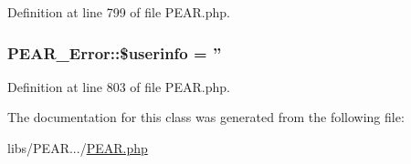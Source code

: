 Definition at line 799 of file P\-E\-A\-R.\-php.

\hypertarget{classPEAR__Error_ad201e08b4f3faace7a729ccf2744fdee}{
\subsubsection[{\$userinfo}]{\setlength{\rightskip}{0pt plus 5cm}P\-E\-A\-R\-\_\-\-Error\-::\$userinfo = ''}}\label{classPEAR__Error_ad201e08b4f3faace7a729ccf2744fdee}


Definition at line 803 of file P\-E\-A\-R.\-php.



The documentation for this class was generated from the following file\-:\begin{DoxyCompactItemize}
\item 
libs/\-P\-E\-A\-R.../\hyperlink{PEAR_8php}{P\-E\-A\-R.\-php}\end{DoxyCompactItemize}

